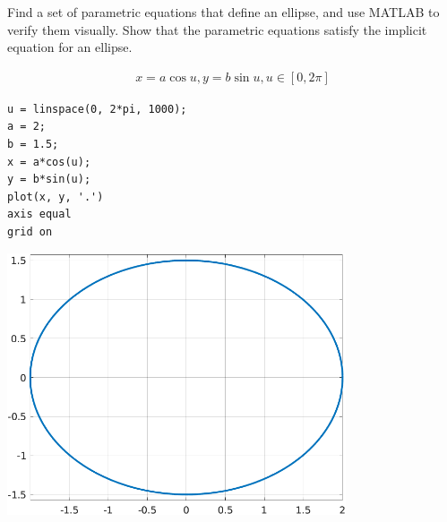 Find a set of parametric equations that define an ellipse, and use MATLAB to verify them visually. Show that the parametric equations satisfy the implicit equation for an ellipse.

\begin{solution}
\begin{align*}
    x = a\cos{u}, y = b\sin{u}, u\in\left[ 0, 2\pi \right]
\end{align*}

\begin{lstlisting}
u = linspace(0, 2*pi, 1000);
a = 2;
b = 1.5;
x = a*cos(u);
y = b*sin(u);
plot(x, y, '.')
axis equal
grid on
\end{lstlisting}

\begin{center}
    \includegraphics[width=0.75\textwidth]{img/e9p1.png}
\end{center}
\end{solution}